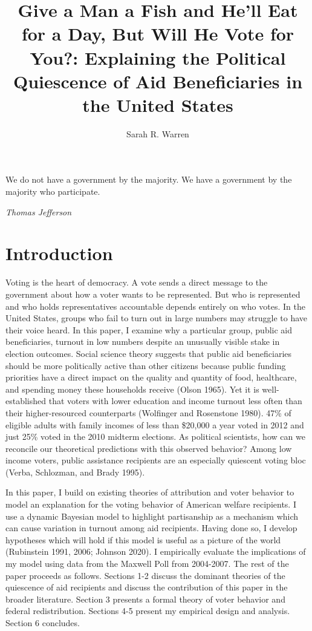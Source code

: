 \documentclass[12pt]{paper}
\title{Give a Man a Fish and He'll Eat for a Day, But Will He Vote for You?: Explaining the Political Quiescence of Aid Beneficiaries in the United States}
\author{Sarah R. Warren}
\date{}
\begin{document}
\maketitle

\setlength{}
\epigraph{We do not have a government by the majority. We have a government by the majority who participate.}{\textit{Thomas Jefferson}}

\section*{Introduction}
Voting is the heart of democracy. A vote sends a direct message to the government about how a voter wants to be represented. But who is represented and who holds representatives accountable depends entirely on who votes. In the United States, groups who fail to turn out in large numbers may struggle to have their voice heard. In this paper, I examine why a particular group, public aid beneficiaries, turnout in low numbers despite an unusually visible stake in election outcomes.  Social science theory suggests that public aid beneficiaries should be more politically active than other citizens because public funding priorities have a direct impact on the quality and quantity of food, healthcare, and spending money these households receive (Olson 1965). Yet it is well-established that voters with lower education and income turnout less often than their higher-resourced counterparts (Wolfinger and Rosenstone 1980). 47\% of eligible adults with family incomes of less than \$20,000 a year voted in 2012 and just 25\% voted in the 2010 midterm elections. As political scientists, how can we reconcile our theoretical predictions with this observed behavior? Among low income voters, public assistance recipients are an especially quiescent voting bloc (Verba, Schlozman, and Brady 1995). 

In this paper, I build on existing theories of attribution and voter behavior to model an explanation for the voting behavior of American welfare recipients. I use a dynamic Bayesian model to highlight partisanship as a mechanism which can cause variation in turnout among aid recipients. Having done so, I develop hypotheses which will hold if this model is useful as a picture of the world (Rubinstein 1991, 2006; Johnson 2020). I empirically evaluate the implications of my model using data from the Maxwell Poll from 2004-2007. The rest of the paper proceeds as follows. Sections 1-2 discuss the dominant theories of the quiescence of aid recipients and discuss the contribution of this paper in the broader literature. Section 3 presents a formal theory of voter behavior and federal redistribution. Sections 4-5 present my empirical design and analysis. Section 6 concludes.
\end{document}
